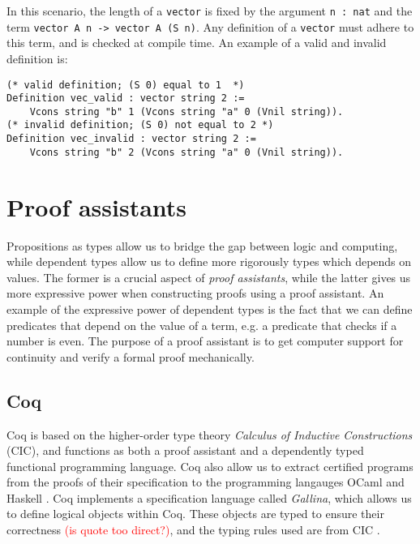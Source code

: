 In this scenario, the length of a \lstinline{vector} is fixed by the argument \lstinline{n : nat}
and the term \lstinline{vector A n -> vector A (S n)}.
Any definition of a \lstinline{vector} must adhere to this term, and is checked at compile time.
An example of a valid and invalid definition is:

\begin{minipage}{\linewidth}
\begin{lstlisting}[language=Coq, label={lst:dep_type_vec_ex}, caption={Examples of vectors in Coq}]
(* valid definition; (S 0) equal to 1  *)
Definition vec_valid : vector string 2 :=
    Vcons string "b" 1 (Vcons string "a" 0 (Vnil string)).
(* invalid definition; (S 0) not equal to 2 *)
Definition vec_invalid : vector string 2 :=
    Vcons string "b" 2 (Vcons string "a" 0 (Vnil string)).
\end{lstlisting}
\end{minipage}

\section{Proof assistants}
\label{sec:proof_assistants}

Propositions as types allow us to bridge the gap between logic and computing,
while dependent types allow us to define more rigorously types which depends on values.
The former is a crucial aspect of \textit{proof assistants}, while the latter gives
us more expressive power when constructing proofs using a proof assistant.
An example of the expressive power of dependent types is the fact that we can define
predicates that depend on the value of a term, e.g. a predicate that checks if a number is even.
The purpose of a proof assistant is to get computer support for continuity and verify a formal proof mechanically.

\subsection{Coq}
\label{ssec:coq}

Coq is based on the higher-order type theory \textit{Calculus of Inductive Constructions} (CIC), and
functions as both a proof assistant and a dependently typed functional programming language.
Coq also allow us to extract certified programs from the proofs of their specification to
the programming langauges OCaml and Haskell \cite{cintro}.
Coq implements a specification language called \textit{Gallina},
which allows us to define logical objects within Coq.
These objects are typed to ensure their correctness \textcolor{red}{(is quote too direct?)},
and the typing rules used are from CIC \cite{cic}.

